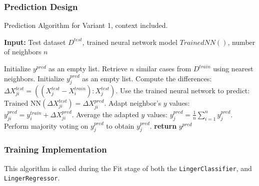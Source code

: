 \documentclass[a4paper, 12pt]{report}
\begin{document}
\subsubsection{Prediction Design}
\begin{algorithm}[H]
	\caption{Prediction Algorithm for Variant 1, context included.}
	\label{alg:prediction_variant_1}
	\textbf{Input:} Test dataset $D^{test}$, trained neural network model $Trained NN()$, number of neighbors $n$
	\begin{algorithmic}[1]
        \State Initialize $y^{pred}$ as an empty list.
			\State Retrieve $n$ similar cases from $D^{train}$ using nearest neighbors.
			\State Initialize $y^{pred}_j$ as an empty list.
				\State Compute the differences: $\Delta X^{test}_{ji} = ((X^{test}_j - X^{train}_i):X^{test}_j)$.
				\State Use the trained neural network to predict: $\text{Trained NN}(\Delta X^{test}_{ji}) = \Delta X^{pred}_{ji}$.
				\State Adapt neighbor's $y$ values: $y^{pred}_{ji} = y^{train}_i + \Delta X^{pred}_{ji}$.
			\EndFor
				\State Average the adapted $y$ values: $y^{pred}_j = \frac{1}{n} \sum_{i=1}^{n} y^{pred}_{j}$.
				\State Perform majority voting on $y^{pred}_j$ to obtain $y^{pred}_j$.
			\EndIf
		\EndFor
		\State \textbf{return} $y^{pred}$
	\end{algorithmic}
\end{algorithm}
\clearpage

\subsubsection{Training Implementation}
This algorithm is called during the Fit stage of both the \texttt{LingerClassifier}, and \texttt{LingerRegressor}.
\end{document}
